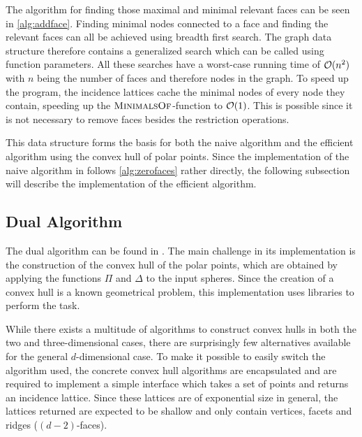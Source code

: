 The algorithm for finding those maximal and minimal relevant faces can be seen in \cref{alg:addface}.
Finding minimal nodes connected to a face and finding the relevant faces can all be achieved using breadth first search.
The graph data structure therefore contains a generalized search which can be called using function parameters.
All these searches have a worst-case running time of $\mathcal{O}(n^2)$ with $n$ being the number of faces and therefore nodes in the graph.
To speed up the program, the incidence lattices cache the minimal nodes of every node they contain, speeding up the $\textsc{MinimalsOf}$-function to $\mathcal{O}(1)$.
This is possible since it is not necessary to remove faces besides the restriction operations.

This data structure forms the basis for both the naive algorithm and the efficient algorithm using the convex hull of polar points.
Since the implementation of the naive algorithm in  follows \cref{alg:zerofaces} rather directly, the following subsection will describe the implementation of the efficient algorithm.

\subsection{Dual Algorithm}
\label{sub:impl_dual_algorithm}
The dual algorithm can be found in .
The main challenge in its implementation is the construction of the convex hull of the polar points, which are obtained by applying the functions $\Pi$ and $\Delta$ to the input spheres.
Since the creation of a convex hull is a known geometrical problem, this implementation uses libraries to perform the task.

While there exists a multitude of algorithms to construct convex hulls in both the two and three-dimensional cases, there are surprisingly few alternatives available for the general $d$-dimensional case.
To make it possible to easily switch the algorithm used, the concrete convex hull algorithms are encapsulated and are required to implement a simple interface which takes a set of points and returns an incidence lattice.
Since these lattices are of exponential size in general, the lattices returned are expected to be shallow and only contain vertices, facets and ridges ($(d-2)$-faces).

